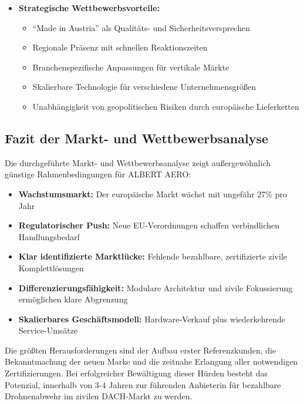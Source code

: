 \documentclass[11pt,a4paper]{article}
\begin{document}
\begin{itemize}
\item \textbf{Strategische Wettbewerbsvorteile:}
\begin{itemize}
\item ``Made in Austria'' als Qualitäts- und Sicherheitsversprechen
\item Regionale Präsenz mit schnellen Reaktionszeiten
\item Branchenspezifische Anpassungen für vertikale Märkte
\item Skalierbare Technologie für verschiedene Unternehmensgrößen
\item Unabhängigkeit von geopolitischen Risiken durch europäische Lieferketten
\end{itemize}
\end{itemize}

\subsection{Fazit der Markt- und Wettbewerbsanalyse}

Die durchgeführte Markt- und Wettbewerbsanalyse zeigt außergewöhnlich günstige Rahmenbedingungen für ALBERT AERO:

\begin{itemize}
\item \textbf{Wachstumsmarkt:} Der europäische Markt wächst mit ungefähr 27\% pro Jahr
\item \textbf{Regulatorischer Push:} Neue EU-Verordnungen schaffen verbindlichen Handlungsbedarf
\item \textbf{Klar identifizierte Marktlücke:} Fehlende bezahlbare, zertifizierte zivile Komplettlösungen
\item \textbf{Differenzierungsfähigkeit:} Modulare Architektur und zivile Fokussierung ermöglichen klare Abgrenzung
\item \textbf{Skalierbares Geschäftsmodell:} Hardware-Verkauf plus wiederkehrende Service-Umsätze
\end{itemize}

Die größten Herausforderungen sind der Aufbau erster Referenzkunden, die Bekanntmachung der neuen Marke und die zeitnahe Erlangung aller notwendigen Zertifizierungen. Bei erfolgreicher Bewältigung dieser Hürden besteht das Potenzial, innerhalb von 3-4 Jahren zur führenden Anbieterin für bezahlbare Drohnenabwehr im zivilen DACH-Markt zu werden.


\end{document}

